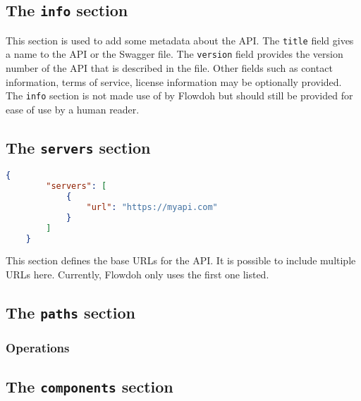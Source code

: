 \subsection{The \texttt{info} section}
This section is used to add some metadata about the API. The \texttt{title} field gives a name to the API or the Swagger file. The \texttt{version} field provides the version number of the API that is described in the file. Other fields such as contact information, terms of service, license information may be optionally provided. The \texttt{info} section is not made use of by Flowdoh but should still be provided for ease of use by a human reader.
\subsection{The \texttt{servers} section}
\begin{lstlisting}[caption={A URL defined in the \texttt{servers} section},label={code:servers},language=json]
    {
        "servers": [
            {
                "url": "https://myapi.com"
            }
        ]
    }
\end{lstlisting}
This section defines the base URLs for the API. It is possible to include multiple URLs here. Currently, Flowdoh only uses the first one listed.
\subsection{The \texttt{paths} section}
\subsubsection{Operations}
\subsection{The \texttt{components} section}